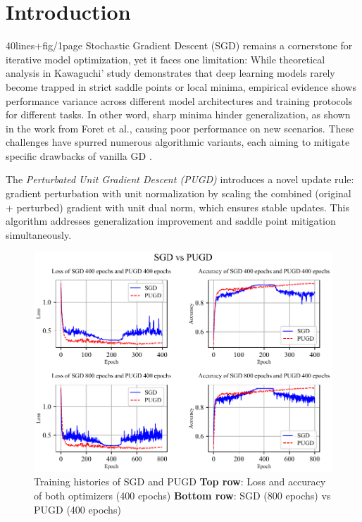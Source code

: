 \documentclass[10pt,twocolumn,letterpaper]{article}
\begin{document}
\section{Introduction} 40lines+fig/1page
Stochastic Gradient Descent (SGD) \cite{4308316} remains a cornerstone for iterative model optimization, yet it faces one limitation: While theoretical analysis in Kawaguchi' study \cite{kawaguchi2016deeplearningpoorlocal} demonstrates that deep learning models rarely become trapped in strict saddle points or local minima, empirical evidence shows performance variance across different model architectures and training protocols for different tasks. In other word, sharp minima hinder generalization, as shown in the work from Foret et al.\cite{foret2021sharpnessawareminimizationefficientlyimproving}, causing poor performance on new scenarios. These challenges have spurred numerous algorithmic variants, each aiming to mitigate specific drawbacks of vanilla GD \cite{ruder2017overviewgradientdescentoptimization}.

The \textit{Perturbated Unit Gradient Descent (PUGD)} \cite{Tseng_2022} introduces a novel update rule: gradient perturbation with unit normalization by scaling the combined (original + perturbed) gradient with unit dual norm, which ensures stable updates. This algorithm addresses generalization improvement and saddle point mitigation simultaneously.

\begin{figure}[htbp]
	\center
	\includegraphics[width=\columnwidth]{images/SGDvsPUGD.pdf}
	\caption{Training histories of SGD and PUGD
    \textbf{Top row}: Loss and accuracy of both optimizers (400 epochs)
    \textbf{Bottom row}: SGD (800 epochs) vs PUGD (400 epochs)}
	\label{fig:SGDvsPUGD}
\end{figure}
\end{document}
